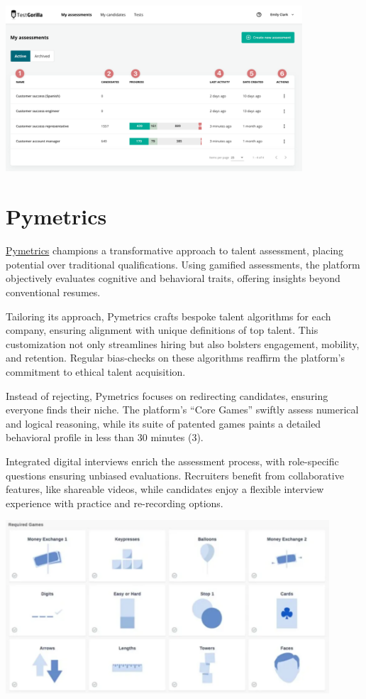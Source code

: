 \documentclass[
]{book}
\begin{document}
\includegraphics[width=4.35417in,height=\textheight]{testgorilla pic.png}

\hypertarget{pymetrics}{%
\section{Pymetrics}\label{pymetrics}}

\href{https://www.pymetrics.ai/}{Pymetrics} champions a transformative approach to talent assessment, placing potential over traditional qualifications. Using gamified assessments, the platform objectively evaluates cognitive and behavioral traits, offering insights beyond conventional resumes.

Tailoring its approach, Pymetrics crafts bespoke talent algorithms for each company, ensuring alignment with unique definitions of top talent. This customization not only streamlines hiring but also bolsters engagement, mobility, and retention. Regular bias-checks on these algorithms reaffirm the platform's commitment to ethical talent acquisition.

Instead of rejecting, Pymetrics focuses on redirecting candidates, ensuring everyone finds their niche. The platform's ``Core Games'' swiftly assess numerical and logical reasoning, while its suite of patented games paints a detailed behavioral profile in less than 30 minutes (3).

Integrated digital interviews enrich the assessment process, with role-specific questions ensuring unbiased evaluations. Recruiters benefit from collaborative features, like shareable videos, while candidates enjoy a flexible interview experience with practice and re-recording options.

\includegraphics[width=4.75in,height=\textheight]{pymetrics pic2.png}
\end{document}
